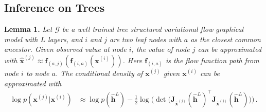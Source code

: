 \documentclass{article}
\begin{document}
\subsection{Inference on Trees}



\textbf{Lemma 1.} {\it Let $\mathcal{G}$ be a well trained tree structured variational flow graphical model with $L$ layers, and $i$ and $j$ are two leaf nodes with $a$ as the closest common ancestor. 
Given observed value at node $i$, the value of node $j$ can be approximated with $\widehat{\mathbf{x}}^{(j)} \approx  \mathbf{f}_{(a,j)}(\mathbf{f}_{(i, a)}(\mathbf{x}^{(i)}))$. Here $\mathbf{f}_{(i, a)}$ is the flow function path from node $i$ to node $a$. 
The conditional density of $\mathbf{x}^{(j)}$ given $\mathbf{x}^{(i)}$ can be approximated with 
\begin{align*} %
\log p(\mathbf{x}^{(j)} | \mathbf{x}^{(i)}) &\approx  \log p(\widehat{\mathbf{h}}^L) -  \frac{1}{2} \log \big(\det \big(\mathbf{J}_{\widehat{\mathbf{x}}^{(j)}}(\widehat{\mathbf{h}}^L)^\top\mathbf{J}_{\widehat{\mathbf{x}}^{(j)}}(\widehat{\mathbf{h}}^L)\big) \big) \, .
\end{align*}
}
\end{document}

